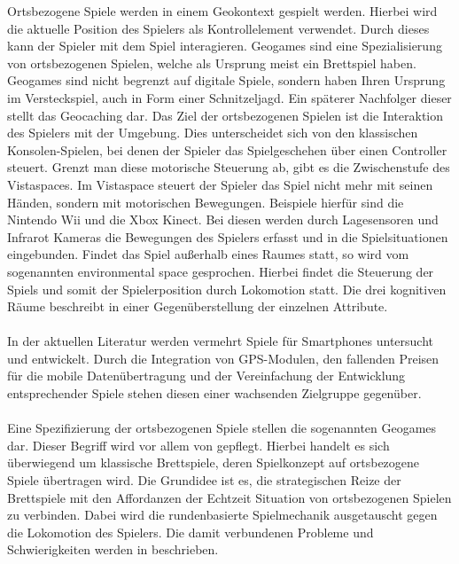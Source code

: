 Ortsbezogene Spiele werden in einem Geokontext gespielt werden. Hierbei wird die aktuelle Position des Spielers als Kontrollelement verwendet.\cite{Schlieder.2006} Durch dieses kann der Spieler mit dem Spiel interagieren.
Geogames sind eine Spezialisierung von ortsbezogenen Spielen, welche als Ursprung meist ein Brettspiel haben.
Geogames sind nicht begrenzt auf digitale Spiele, sondern haben Ihren Ursprung im Versteckspiel, auch in Form einer Schnitzeljagd. Ein späterer Nachfolger dieser stellt das Geocaching dar.\cite{Simanowski.2008}
Das Ziel der ortsbezogenen Spielen ist die Interaktion des Spielers mit der Umgebung. Dies unterscheidet sich von den klassischen Konsolen-Spielen, bei denen der Spieler das Spielgeschehen über einen Controller steuert. Grenzt man diese motorische Steuerung ab, gibt es die Zwischenstufe des Vistaspaces. Im Vistaspace steuert der Spieler das Spiel nicht mehr mit seinen Händen, sondern mit motorischen Bewegungen. Beispiele hierfür sind die Nintendo Wii und die Xbox Kinect. Bei diesen werden durch Lagesensoren und Infrarot Kameras die Bewegungen des Spielers erfasst und in die Spielsituationen eingebunden.
Findet das Spiel außerhalb eines Raumes statt, so wird vom sogenannten environmental space gesprochen.
Hierbei findet die Steuerung der Spiels und somit der Spielerposition durch Lokomotion statt.\cite{Benford.2003,Kiefer.2007}
Die drei kognitiven Räume beschreibt \textcite{Berendt.1999} in einer Gegenüberstellung der einzelnen Attribute.
\\\\
In der aktuellen Literatur werden vermehrt Spiele für Smartphones untersucht und entwickelt.\cite{Rashid.2006a}
Durch die Integration von GPS-Modulen, den fallenden Preisen für die mobile Datenübertragung und der Vereinfachung der Entwicklung entsprechender Spiele stehen diesen einer wachsenden Zielgruppe gegenüber.
\\\\
Eine Spezifizierung der ortsbezogenen Spiele stellen die sogenannten Geogames dar. Dieser Begriff wird vor allem von \textcite{Schlieder.2013} gepflegt. Hierbei handelt es sich überwiegend um klassische Brettspiele, deren Spielkonzept auf ortsbezogene Spiele übertragen wird. Die Grundidee ist es, die strategischen Reize der Brettspiele mit den Affordanzen der Echtzeit Situation von ortsbezogenen Spielen zu verbinden. Dabei wird die rundenbasierte Spielmechanik ausgetauscht gegen die Lokomotion des Spielers. Die damit verbundenen Probleme und Schwierigkeiten werden in \textcite{Schlieder.2006} beschrieben.

